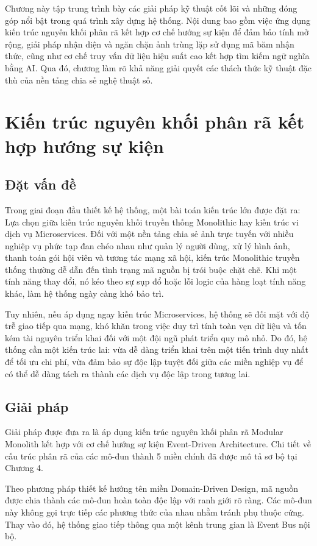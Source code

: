 Chương này tập trung trình bày các giải pháp kỹ thuật cốt lõi và những đóng góp nổi bật trong quá trình xây dựng hệ thống. Nội dung bao gồm việc ứng dụng kiến trúc nguyên khối phân rã kết hợp cơ chế hướng sự kiện để đảm bảo tính mở rộng, giải pháp nhận diện và ngăn chặn ảnh trùng lặp sử dụng mã băm nhận thức, cũng như cơ chế truy vấn dữ liệu hiệu suất cao kết hợp tìm kiếm ngữ nghĩa bằng AI. Qua đó, chương làm rõ khả năng giải quyết các thách thức kỹ thuật đặc thù của nền tảng chia sẻ nghệ thuật số.

\section{Kiến trúc nguyên khối phân rã kết hợp hướng sự kiện}

\subsection{Đặt vấn đề}
Trong giai đoạn đầu thiết kế hệ thống, một bài toán kiến trúc lớn được đặt ra: Lựa chọn giữa kiến trúc nguyên khối truyền thống Monolithic hay kiến trúc vi dịch vụ Microservices. Đối với một nền tảng chia sẻ ảnh trực tuyến với nhiều nghiệp vụ phức tạp đan chéo nhau như quản lý người dùng, xử lý hình ảnh, thanh toán gói hội viên và tương tác mạng xã hội, kiến trúc Monolithic truyền thống thường dễ dẫn đến tình trạng mã nguồn bị trói buộc chặt chẽ. Khi một tính năng thay đổi, nó kéo theo sự sụp đổ hoặc lỗi logic của hàng loạt tính năng khác, làm hệ thống ngày càng khó bảo trì.

Tuy nhiên, nếu áp dụng ngay kiến trúc Microservices, hệ thống sẽ đối mặt với độ trễ giao tiếp qua mạng, khó khăn trong việc duy trì tính toàn vẹn dữ liệu và tốn kém tài nguyên triển khai đối với một đội ngũ phát triển quy mô nhỏ. Do đó, hệ thống cần một kiến trúc lai: vừa dễ dàng triển khai trên một tiến trình duy nhất để tối ưu chi phí, vừa đảm bảo sự độc lập tuyệt đối giữa các miền nghiệp vụ để có thể dễ dàng tách ra thành các dịch vụ độc lập trong tương lai.

\subsection{Giải pháp}
Giải pháp được đưa ra là áp dụng kiến trúc nguyên khối phân rã Modular Monolith kết hợp với cơ chế hướng sự kiện Event-Driven Architecture. Chi tiết về cấu trúc phân rã của các mô-đun thành 5 miền chính đã được mô tả sơ bộ tại Chương 4.

Theo phương pháp thiết kế hướng tên miền Domain-Driven Design, mã nguồn được chia thành các mô-đun hoàn toàn độc lập với ranh giới rõ ràng. Các mô-đun này không gọi trực tiếp các phương thức của nhau nhằm tránh phụ thuộc cứng. Thay vào đó, hệ thống giao tiếp thông qua một kênh trung gian là Event Bus nội bộ. 

